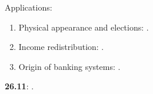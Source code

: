 \documentclass[letterpaper]{article}
\renewenvironment{itemize}{
  \begin{list}{}{
    \setlength{\leftmargin}{1.5em}
  }
}{
  \end{list}
}
\begin{document}
\begin{enumerate}
\begin{itemize}
\begin{enumerate}
          \end{enumerate}

       \item[$\diamond$] Applications:

           \begin{enumerate}


           \item[$\bullet$] Physical appearance and elections: \href{https://doi.org/10.1111/pops.12940}{}.


           \item[$\bullet$] Income redistribution: \href{https://doi.org/10.1111/j.1467-9221.2006.00509.x}{}.


          \item[$\bullet$] Origin of banking systems: \href{https://search.ebscohost.com/login.aspx?direct=true&db=nlebk&AN=516924&site=ehost-live&scope=site&ebv=EB&ppid=pp_88}{}.


         \end{enumerate}

       
      \end{itemize}

 \item {\bf 26.11}:  {\color{ForestGreen}{\bf Field Experiments}}.



\end{enumerate}
\end{document}
